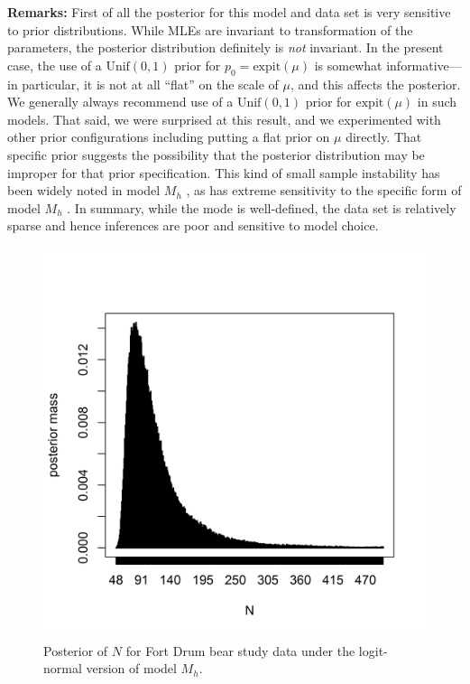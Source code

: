 {\bf Remarks:}
First of all the posterior for this model and data set is
very sensitive to prior distributions. While MLEs are invariant to
transformation of the parameters, the posterior distribution
definitely is {\it not} invariant. In the present case, the use of a
$\mbox{Unif}(0,1)$ prior for $p_{0} = \mbox{expit}(\mu)$ is somewhat
informative---in particular, it is not at all ``flat'' on the scale
of $\mu$, and this affects the posterior.  We generally always
recommend use of a $\mbox{Unif}(0,1)$ prior for $\mbox{expit}(\mu)$ in such
models. That said, we were surprised at this result, and we
experimented with other prior configurations including putting a flat
prior on $\mu$ directly. That specific prior suggests the possibility
that the posterior distribution may be improper for that prior
specification. This kind of small sample instability has been widely
noted in model $M_h$ \citep{fienberg_etal:1999, dorazio_royle:2003},
as has extreme sensitivity to the specific form of model $M_{h}$ \citep{link:2003}.
In summary, while the mode is well-defined, the data set is relatively
sparse and hence inferences are poor and sensitive to model choice.

\begin{figure}
\centering
\includegraphics[height=4.5in,width=4.5in]{Ch3-Closed/figs/bear-modelMh-post}
\caption{Posterior of $N$ for Fort Drum bear study data under the
logit-normal version of model $M_h$.
}
\label{closed.fig.bearMh}
\end{figure}





